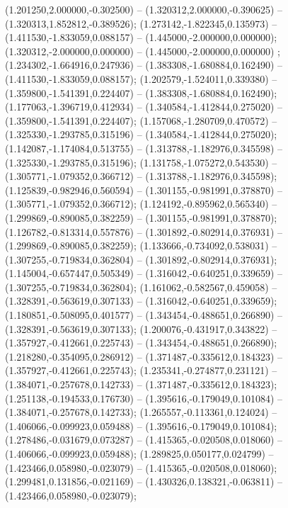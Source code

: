  (1.201250,2.000000,-0.302500) -- (1.320312,2.000000,-0.390625) -- (1.320313,1.852812,-0.389526);
 (1.273142,-1.822345,0.135973) -- (1.411530,-1.833059,0.088157) -- (1.445000,-2.000000,0.000000);
 (1.320312,-2.000000,0.000000) -- (1.445000,-2.000000,0.000000) ;
 (1.234302,-1.664916,0.247936) -- (1.383308,-1.680884,0.162490) -- (1.411530,-1.833059,0.088157);
 (1.202579,-1.524011,0.339380) -- (1.359800,-1.541391,0.224407) -- (1.383308,-1.680884,0.162490);
 (1.177063,-1.396719,0.412934) -- (1.340584,-1.412844,0.275020) -- (1.359800,-1.541391,0.224407);
 (1.157068,-1.280709,0.470572) -- (1.325330,-1.293785,0.315196) -- (1.340584,-1.412844,0.275020);
 (1.142087,-1.174084,0.513755) -- (1.313788,-1.182976,0.345598) -- (1.325330,-1.293785,0.315196);
 (1.131758,-1.075272,0.543530) -- (1.305771,-1.079352,0.366712) -- (1.313788,-1.182976,0.345598);
 (1.125839,-0.982946,0.560594) -- (1.301155,-0.981991,0.378870) -- (1.305771,-1.079352,0.366712);
 (1.124192,-0.895962,0.565340) -- (1.299869,-0.890085,0.382259) -- (1.301155,-0.981991,0.378870);
 (1.126782,-0.813314,0.557876) -- (1.301892,-0.802914,0.376931) -- (1.299869,-0.890085,0.382259);
 (1.133666,-0.734092,0.538031) -- (1.307255,-0.719834,0.362804) -- (1.301892,-0.802914,0.376931);
 (1.145004,-0.657447,0.505349) -- (1.316042,-0.640251,0.339659) -- (1.307255,-0.719834,0.362804);
 (1.161062,-0.582567,0.459058) -- (1.328391,-0.563619,0.307133) -- (1.316042,-0.640251,0.339659);
 (1.180851,-0.508095,0.401577) -- (1.343454,-0.488651,0.266890) -- (1.328391,-0.563619,0.307133);
 (1.200076,-0.431917,0.343822) -- (1.357927,-0.412661,0.225743) -- (1.343454,-0.488651,0.266890);
 (1.218280,-0.354095,0.286912) -- (1.371487,-0.335612,0.184323) -- (1.357927,-0.412661,0.225743);
 (1.235341,-0.274877,0.231121) -- (1.384071,-0.257678,0.142733) -- (1.371487,-0.335612,0.184323);
 (1.251138,-0.194533,0.176730) -- (1.395616,-0.179049,0.101084) -- (1.384071,-0.257678,0.142733);
 (1.265557,-0.113361,0.124024) -- (1.406066,-0.099923,0.059488) -- (1.395616,-0.179049,0.101084);
 (1.278486,-0.031679,0.073287) -- (1.415365,-0.020508,0.018060) -- (1.406066,-0.099923,0.059488);
 (1.289825,0.050177,0.024799) -- (1.423466,0.058980,-0.023079) -- (1.415365,-0.020508,0.018060);
 (1.299481,0.131856,-0.021169) -- (1.430326,0.138321,-0.063811) -- (1.423466,0.058980,-0.023079);
